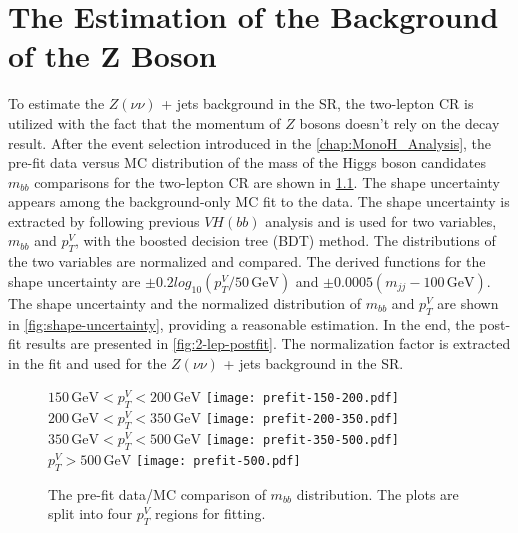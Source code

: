 \documentclass[class=NTHU_thesis, crop=false]{standalone}
\begin{document}
\chapter{The Estimation of the Background of the Z Boson}
\label{chap:Z_bkg_estimation}
To estimate the $Z(\nu\nu)$ + jets background in the SR, the two-lepton CR is utilized with the fact that the momentum of $Z$ bosons doesn't rely on the decay result. After the event selection introduced in the \autoref{chap:MonoH_Analysis}, the pre-fit data versus MC distribution of the mass of the Higgs boson candidates $m_{bb}$ comparisons for the two-lepton CR are shown in \cref{fig:2-lep-prefit}. The shape uncertainty appears among the background-only MC fit to the data. The shape uncertainty is extracted by following previous $VH(bb)$ analysis\cite{Robson:2235887} and is used for two variables, $m_{bb}$ and $p^V_T$, with the boosted decision tree (BDT) method\cite{pmid28114007}. The distributions of the two variables are normalized and compared. The derived functions for the shape uncertainty are $\pm 0.2 log_{10} (p^V_T/50\, \mathrm{GeV})$ and $\pm 0.0005 (m_{jj} - 100\, \mathrm{GeV})$. The shape uncertainty and the normalized distribution of $m_{bb}$ and $p^V_T$ are shown in \cref{fig:shape-uncertainty}, providing a reasonable estimation. In the end, the post-fit results are presented in \cref{fig:2-lep-postfit}. The normalization factor is extracted in the fit and used for the $Z(\nu\nu)$ + jets background in the SR.

\begin{figure}[!hbt]
	\captionsetup[subfigure]{labelformat=empty}
	\centering
	\subcaptionbox
		{$150\, \mathrm{GeV} < p^V_T < 200\, \mathrm{GeV}$
		\label{fig:2-lep-prefit-fig1}}
		{\texttt{[image: prefit-150-200.pdf]}}
	~
	\subcaptionbox
		{$200\, \mathrm{GeV} < p^V_T < 350\, \mathrm{GeV}$
		\label{fig:2-lep-prefit-fig2}}
		{\texttt{[image: prefit-200-350.pdf]}}
	\vspace{\baselineskip}
	\subcaptionbox
		{$350\, \mathrm{GeV} < p^V_T < 500\, \mathrm{GeV}$
		\label{fig:2-lep-prefit-fig3}}
		{\texttt{[image: prefit-350-500.pdf]}}
	~
	\subcaptionbox
		{$p^V_T > 500\, \mathrm{GeV}$
		\label{fig:2-lep-prefit-fig4}}
		{\texttt{[image: prefit-500.pdf]}}
	\caption{The pre-fit data/MC comparison of $m_{bb}$ distribution. The plots are split into four $p^V_T$ regions for fitting.}
	\label{fig:2-lep-prefit}
\end{figure}
\end{document}

